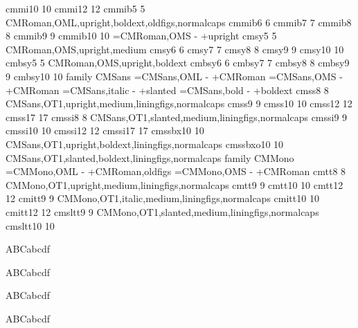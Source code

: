  cmmi10 10 {}
 cmmi12 12 {}
 cmmib5  5  CMRoman,OML,upright,boldext,oldfigs,normalcaps
 cmmib6  6  {}
 cmmib7  7  {}
 cmmib8  8  {}
 cmmib9  9  {}
 cmmib10 10 {}
%
\fontsubstpost =CMRoman,OMS - +upright
 cmsy5  5  CMRoman,OMS,upright,medium
 cmsy6  6  {}
 cmsy7  7  {}
 cmsy8  8  {}
 cmsy9  9  {}
 cmsy10 10 {}
 cmbsy5  5  CMRoman,OMS,upright,boldext
 cmbsy6  6  {}
 cmbsy7  7  {}
 cmbsy8  8  {}
 cmbsy9  9  {}
 cmbsy10 10 {}
%
%
\newfontattr family CMSans
\fontsubstpost =CMSans,OML - +CMRoman
\fontsubstpost =CMSans,OMS - +CMRoman
\fontsubstpost =CMSans,italic - +slanted
\fontsubstpost =CMSans,bold - +boldext
 cmss8  8  CMSans,OT1,upright,medium,liningfigs,normalcaps
 cmss9  9  {}
 cmss10 10 {}
 cmss12 12 {}
 cmss17 17 {}
 cmssi8  8  CMSans,OT1,slanted,medium,liningfigs,normalcaps
 cmssi9  9  {}
 cmssi10 10 {}
 cmssi12 12 {}
 cmssi17 17 {}
%
 cmssbx10  10 CMSans,OT1,upright,boldext,liningfigs,normalcaps
 cmssbxo10 10 CMSans,OT1,slanted,boldext,liningfigs,normalcaps %
%
%
\newfontattr family CMMono
\fontsubstpost =CMMono,OML - +CMRoman,oldfigs
\fontsubstpost =CMMono,OMS - +CMRoman
 cmtt8  8  CMMono,OT1,upright,medium,liningfigs,normalcaps
 cmtt9  9  {}
 cmtt10 10 {}
 cmtt12 12 {}
 cmitt9  9  CMMono,OT1,italic,medium,liningfigs,normalcaps %
 cmitt10 10 {}
 cmitt12 12 {} %
 cmsltt9  9  CMMono,OT1,slanted,medium,liningfigs,normalcaps %
 cmsltt10 10 {}



ABCabcdf

\dumpfontfeatures
ABCabcdf

\dumpfontfeatures
ABCabcdf

\dumpfontfeatures
ABCabcdf

\bye
